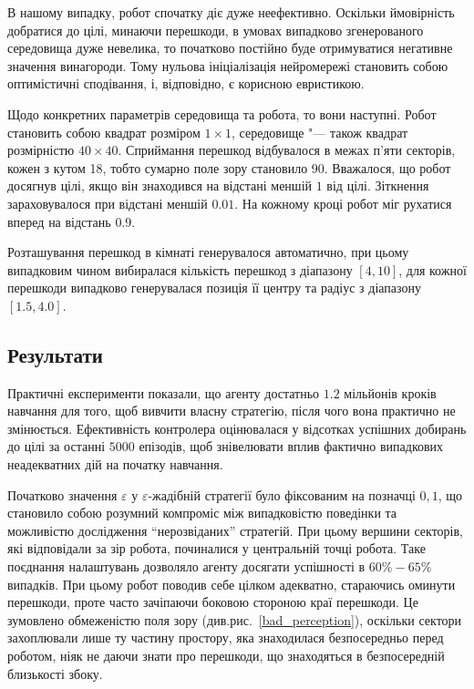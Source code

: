 В нашому випадку, робот спочатку діє дуже неефективно. Оскільки ймовірність добратися до цілі, минаючи перешкоди, в умовах випадково згенерованого середовища дуже невелика, то початково постійно буде отримуватися негативне значення винагороди. Тому нульова ініціалізація нейромережі становить собою оптимістичні сподівання, і, відповідно, є корисною евристикою.

Щодо конкретних параметрів середовища та робота, то вони наступні. Робот становить собою квадрат розміром $1 \times 1$, середовище "--- також квадрат розмірністю $40 \times 40$. Сприймання перешкод відбувалося в межах п'яти секторів, кожен з кутом 18\textdegree, тобто сумарно поле зору становило 90\textdegree. Вважалося, що робот досягнув цілі, якщо він знаходився на відстані меншій $1$ від цілі. Зіткнення зараховувалося при відстані меншій $0.01$. На кожному кроці робот міг рухатися вперед на відстань $0.9$.

Розташування перешкод в кімнаті генерувалося автоматично, при цьому випадковим чином вибиралася кількість перешкод з діапазону $[4,10]$, для кожної перешкоди випадково генерувалася позиція її центру та радіус з діапазону $[1.5, 4.0]$.

\subsection{Результати}

Практичні експерименти показали, що агенту достатньо $1.2$ мільйонів кроків навчання для того, щоб вивчити власну стратегію, після чого вона практично не змінюється. Ефективність контролера оцінювалася у відсотках успішних добирань до цілі за останні $5000$ епізодів, щоб знівелювати вплив фактично випадкових неадекватних дій на початку навчання.

Початково значення $\varepsilon$ у $\varepsilon$-жадібній стратегії було фіксованим на позначці $0,1$, що становило собою розумний компроміс між випадковістю поведінки та можливістю дослідження ``нерозвіданих'' стратегій. При цьому вершини секторів, які відповідали за зір робота, починалися у центральній точці робота. Таке поєднання налаштувань дозволяло агенту досягати успішності в $60\%-65\%$ випадків. При цьому робот поводив себе цілком адекватно, стараючись оминути перешкоди, проте часто зачіпаючи боковою стороною краї перешкоди. Це зумовлено обмеженістю поля зору (див.рис.~\ref{bad_perception}), оскільки сектори захоплювали лише ту частину простору, яка знаходилася безпосередньо перед роботом, ніяк не даючи знати про перешкоди, що знаходяться в безпосередній близькості збоку.

